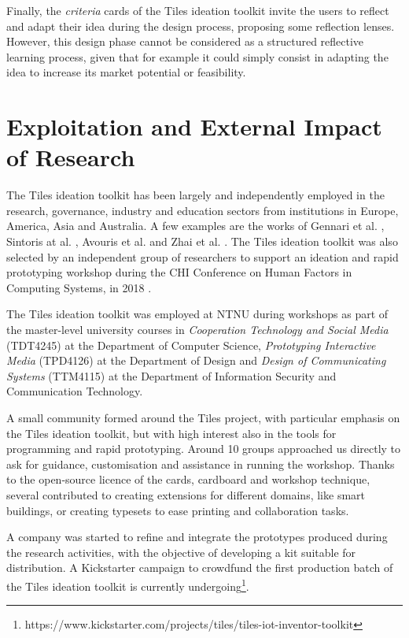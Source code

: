Finally, the \textit{criteria} cards of the Tiles ideation toolkit invite the users to reflect and adapt their idea during the design process, proposing some reflection lenses. However, this design phase cannot be considered as a structured reflective learning process, given that for example it could simply consist in adapting the idea to increase its market potential or feasibility.


\section{Exploitation and External Impact of Research}
\label{sec:exploitation}

The Tiles ideation toolkit has been largely and independently employed in the research, governance, industry and education sectors from institutions in Europe, America, Asia and Australia.
A few examples are the works of 
Gennari et al. \autocite*{gennari_design_2017}, Sintoris at al. \autocite*{sintoris_out_2018}, Avouris et al. \autocite*{avouris_designing_2018} and  Zhai et al. \autocite*{zhai_co-sleep_2018}. The Tiles ideation toolkit was also selected by an independent group of researchers to support an ideation and rapid prototyping workshop during the CHI Conference on Human Factors in Computing Systems, in 2018 \autocite{angelini_internet_2018-1}.

The Tiles ideation toolkit was employed at NTNU during workshops as part of the master-level university courses in \textit{Cooperation Technology and Social Media} (TDT4245) at the Department of Computer Science, \textit{Prototyping Interactive Media} (TPD4126) at the Department of Design and \textit{Design of Communicating Systems} (TTM4115) at the Department of Information Security and Communication Technology.

A small community formed around the Tiles project, with particular emphasis on the Tiles ideation toolkit, but with high interest also in the tools for programming and rapid prototyping. Around 10 groups approached us directly to ask for guidance, customisation and assistance in running the workshop. Thanks to the open-source licence of the cards, cardboard and workshop technique, several contributed to creating extensions for different domains, like smart buildings, or creating typesets to ease printing and collaboration tasks.

A company was started to refine and integrate the prototypes produced during the research activities, with the objective of developing a kit suitable for distribution.
A Kickstarter campaign to crowdfund the first production batch of the Tiles ideation toolkit is currently undergoing\footnote{https://www.kickstarter.com/projects/tiles/tiles-iot-inventor-toolkit}.

